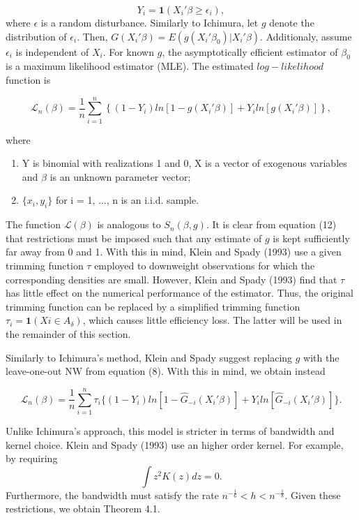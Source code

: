 \documentclass[a4paper]{article}
\begin{document}
\begin{equation}
Y_i =  \mathbf{1}{(X_i'\beta \geq \epsilon_i)},
\end{equation}
where $\epsilon$ is a random disturbance. Similarly to Ichimura, let $g$ denote the distribution of $\epsilon_i$. Then, $G(X_i'\beta) = E(g(X_i'\beta_0)|X_i'\beta)$. Additionaly, assume $\epsilon_i$ is independent of $X_i$. For known $g$, the asymptotically efficient estimator of $\beta_0$ is a maximum likelihood estimator (MLE). The estimated $log-likelihood$ function is

\begin{equation}
\mathcal{L}_n(\beta) = \frac{1}{n}\sum_{i=1}^n \left\{ (1 - Y_i)ln[ 1 - g(X_i'\beta)] + Y_iln[g(X_i'\beta)] \right\},
\end{equation}

where

\begin{enumerate}[label=(\roman*)]
		\item Y is binomial with realizations 1 and 0, X is a vector of exogenous variables and $\beta$ is an unknown parameter vector;
		\item $\{x_i,y_i\}$ for i = 1, ..., n is an i.i.d. sample.
\end{enumerate}

The function $\mathcal{L}(\beta)$ is analogous to $S_n(\beta,g)$. It is clear from equation (12) that restrictions must be imposed such that any estimate of $g$ is kept sufficiently far away from 0 and 1. With this in mind, Klein and Spady (1993) use a given trimming function $\tau$ employed to downweight observations for which the corresponding densities are small. However, Klein and Spady (1993) find that $\tau$ has little effect on the numerical performance of the estimator. Thus, the original trimming function can be replaced by a simplified trimming function $\tau_i = \mathbf{1}{(Xi \in A_\delta)}$, which causes little efficiency loss. The latter will be used in the remainder of this section.

Similarly to Ichimura's method, Klein and Spady suggest replacing $g$ with the leave-one-out NW from equation (8). With this in mind, we obtain instead

\begin{equation}
\mathcal{L}_n(\beta) = \frac{1}{n}\sum_{i=1}^n \tau_{i}\{ (1 - Y_i)ln[ 1 - \hat{G}_{-i}(X_i'\beta)] +  Y_iln[\hat{G}_{-i}(X_i'\beta)]\}.
\end{equation}

Unlike Ichimura's approach, this model is stricter in terms of bandwidth and kernel choice. Klein and Spady (1993) use an higher order kernel. For example, by requiring
\[\int z^{2}K(z)dz = 0.\]
Furthermore, the bandwidth must satisfy the rate $ n^{-\frac{1}{6}} < h < n^{-\frac{1}{8}}$. Given these restrictions, we obtain Theorem 4.1.
\end{document}
